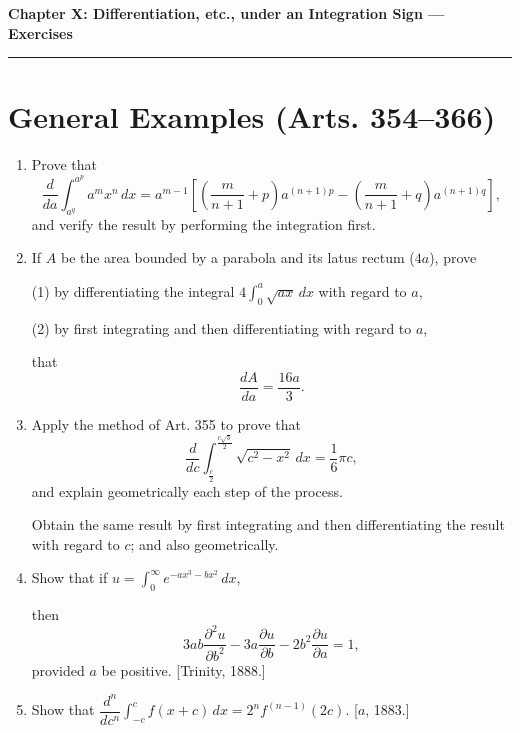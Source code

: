 \documentclass[11pt, a4paper]{article}
\newcommand{\source}[1]{\hfill\textnormal{[#1]}}
\begin{document}
\newpage

\begin{center}
    {\LARGE \bfseries \color{accent} Chapter X: Differentiation, etc., under an Integration Sign --- Exercises}\\
    \vspace{0.2cm}
    {\color{accent}\rule{0.55\linewidth}{0.8pt}}
\end{center}
\vspace{0.35cm}

\section*{General Examples (Arts. 354--366)}

\begin{enumerate}[leftmargin=2em]

\item Prove that
\[
\frac{d}{da}\int_{a^q}^{a^p} a^m x^n\,dx=a^{m-1}\left[\left(\frac{m}{n+1}+p\right)a^{(n+1)p}-\left(\frac{m}{n+1}+q\right)a^{(n+1)q}\right],
\]
and verify the result by performing the integration first.

\item If $A$ be the area bounded by a parabola and its latus rectum ($4a$), prove

(1) by differentiating the integral $4\displaystyle\int_0^a \sqrt{ax}\,dx$ with regard to $a$,

(2) by first integrating and then differentiating with regard to $a$,

that
\[
\frac{dA}{da}=\frac{16a}{3}.
\]

\item Apply the method of Art. 355 to prove that
\[
\frac{d}{dc}\int_{\frac{c}{2}}^{\frac{c\sqrt3}{2}}\sqrt{c^2-x^2}\,dx=\frac16\pi c,
\]
and explain geometrically each step of the process.

Obtain the same result by first integrating and then differentiating the result with regard to $c$; and also geometrically.

\item Show that if $u=\displaystyle\int_0^\infty e^{-ax^3-bx^2}\,dx$,

then
\[
3ab\frac{\partial^2u}{\partial b^2}-3a\frac{\partial u}{\partial b}-2b^2\frac{\partial u}{\partial a}=1,
\]
provided $a$ be positive. \source{Trinity, 1888.}

\item Show that $\dfrac{d^n}{dc^n}\displaystyle\int_{-c}^c f(x+c)\,dx=2^nf^{(n-1)}(2c)$. \source{$a$, 1883.}


\end{enumerate}
\end{document}
